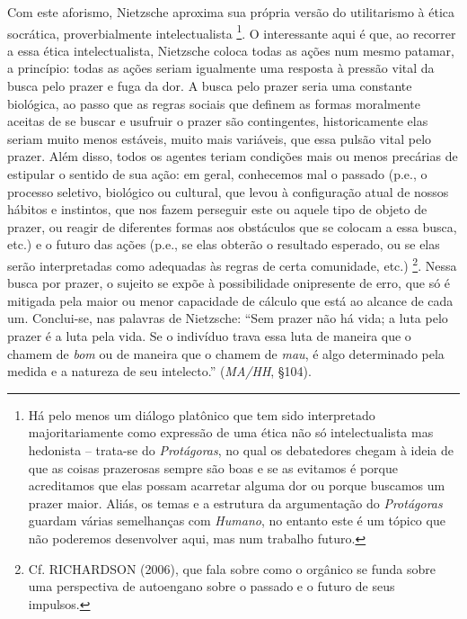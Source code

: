 \documentclass[
	12pt,				%
	openright,			%
	oneside,			%
	a4paper,			%
	english,			%
	french,				%
	spanish,			%
	brazil				%
	]{abntex2}
\begin{document}
Com este aforismo, Nietzsche aproxima sua própria versão do utilitarismo à ética socrática, proverbialmente intelectualista
\footnote{Há pelo menos um diálogo platônico que tem sido interpretado majoritariamente como expressão de uma ética não só intelectualista mas  hedonista – trata-se do \textit{Protágoras}, no qual os debatedores chegam à ideia de que as coisas prazerosas sempre são boas e se as evitamos é porque acreditamos que elas possam acarretar alguma dor ou porque buscamos um prazer maior. Aliás, os temas e a estrutura da argumentação do \textit{Protágoras} guardam várias semelhanças com \textit{Humano}, no entanto este é um tópico que não poderemos desenvolver aqui, mas num trabalho futuro.}. 
O interessante aqui é que, ao recorrer a essa ética intelectualista, Nietzsche coloca todas as ações num mesmo patamar, a princípio: todas as ações seriam igualmente uma resposta à pressão vital da busca pelo prazer e fuga da dor. A busca pelo prazer seria uma constante biológica, ao passo que as regras sociais que definem as formas moralmente aceitas de se buscar e usufruir o prazer são contingentes, historicamente elas seriam muito menos estáveis, muito mais variáveis, que essa pulsão vital pelo prazer. Além disso, todos os agentes teriam condições mais ou menos precárias de estipular o sentido de sua ação: em geral, conhecemos mal o passado (p.e., o processo seletivo, biológico ou cultural, que levou à configuração atual de nossos hábitos e instintos, que nos fazem perseguir este ou aquele tipo de objeto de prazer, ou reagir de diferentes formas aos obstáculos que se colocam a essa busca, etc.) e o futuro das ações (p.e., se elas obterão o resultado esperado, ou se elas serão interpretadas como adequadas às regras de certa comunidade, etc.)
\footnote{Cf. RICHARDSON (2006), que fala sobre como o orgânico se funda sobre uma perspectiva de autoengano sobre o passado e o futuro de seus impulsos.}. 
Nessa busca por prazer, o sujeito se expõe à possibilidade onipresente de erro, que só é mitigada pela maior ou menor capacidade de cálculo que está ao alcance de cada um. Conclui-se, nas palavras de Nietzsche: “Sem prazer não há vida; a luta pelo prazer é a luta pela vida. Se o indivíduo trava essa luta de maneira que o chamem de \textit{bom} ou de maneira que o chamem de \textit{mau}, é algo determinado pela medida e a natureza de seu intelecto.” (\textit{MA/HH}, §104).
\end{document}
